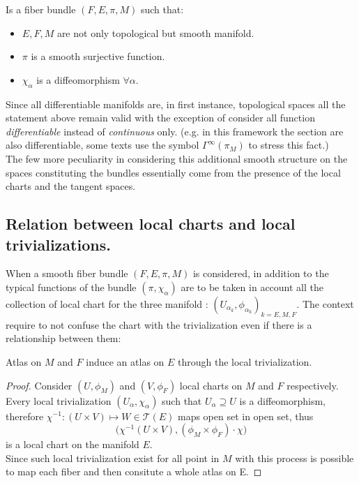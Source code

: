 \documentclass[a4paper,12pt]{scrartcl}    %
\begin{document}
\begin{definition}
Is  a fiber bundle $(F,E, \pi, M )$ such that:
\begin{itemize}
\item $E,F,M$ are not only topological but smooth manifold.
\item $\pi$ is a smooth surjective function.
\item $\chi_{\alpha} $ is a diffeomorphism $\forall \alpha$.
\end{itemize}
\end{definition}

Since all differentiable manifolds are, in first instance, topological spaces all the statement above remain valid with the exception of consider all function \emph{differentiable} instead of \emph{continuous} only.
(e.g. in this framework the section are also differentiable, some texts use the symbol $\Gamma^{\infty} (\pi_M)$ to stress this fact.) 
\\
The few more peculiarity in considering this additional smooth structure on the spaces constituting the bundles essentially come from the presence of the local charts and the tangent spaces.

\subsection{Relation between local charts and local trivializations.}
When a smooth fiber bundle $(F,E,\pi,M)$ is considered, in addition to the typical functions of the bundle $(\pi, \chi_{\alpha})$ are to be taken in account all the collection of local chart for the three manifold : $(U_{\alpha_k}, \phi_{\alpha_k})_{k = E,M,F}$.
The context require to not confuse the chart with the trivialization even if there is a relationship between them:

\begin{proposition}
Atlas on $M$ and $F$ induce an atlas on $E$ through the local trivialization.
\end{proposition}
\begin{proof}
Consider $(U, \phi_{M})$ and $(V, \phi_{F})$ local charts on $M$ and $F$ respectively.
\\
Every local trivialization $(U_{\alpha}, \chi_{\alpha})$ such that $U_{\alpha} \supseteq U$ is a diffeomorphism, 
\\
therefore $\chi^{-1}:(U \times V) \mapsto W \in \mathcal{T}(E)$ maps open set in open set, thus 
\begin{displaymath}
\big( \chi^{-1} ( U \times	V), (\phi_{M} \times \phi_{F}) \cdot \chi \big)
\end{displaymath}
is a local chart on the manifold $E$.
\\
Since such local trivialization exist for all point in $M$ with this process is possible to map each fiber and then consitute a whole atlas on E.
\end{proof}
\end{document}
